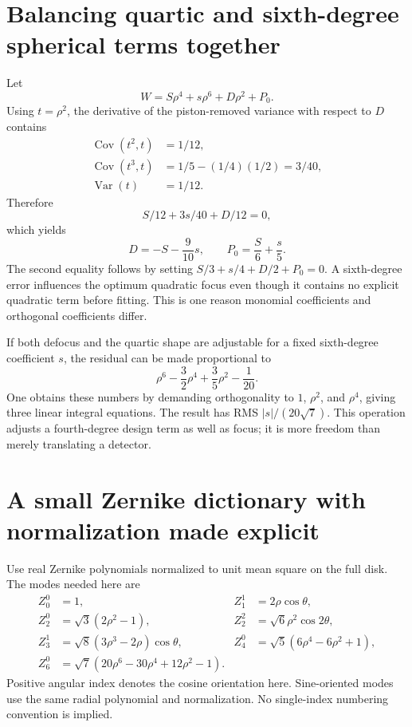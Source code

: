 \section{Balancing quartic and sixth-degree spherical terms together}
Let
\begin{equation}
 W=S\rho^4+s\rho^6+D\rho^2+P_0.
\end{equation}
Using $t=\rho^2$, the derivative of the piston-removed variance with respect
to $D$ contains
\begin{align}
 \operatorname{Cov}(t^2,t)&=1/12,\\
 \operatorname{Cov}(t^3,t)&=1/5-(1/4)(1/2)=3/40,\\
 \operatorname{Var}(t)&=1/12.
\end{align}
Therefore
\begin{equation}
 S/12+3s/40+D/12=0,
\end{equation}
which yields
\begin{equation}
 \boxed{D=-S-\frac9{10}s,\qquad P_0=\frac S6+\frac s5.}
 \label{ab:balance46}
\end{equation}
The second equality follows by setting
$S/3+s/4+D/2+P_0=0$. A sixth-degree error influences the optimum quadratic
focus even though it contains no explicit quadratic term before fitting.
This is one reason monomial coefficients and orthogonal coefficients differ.

If both defocus and the quartic shape are adjustable for a fixed sixth-degree
coefficient $s$, the residual can be made proportional to
\begin{equation}
 \rho^6-\frac32\rho^4+\frac35\rho^2-\frac1{20}.
\end{equation}
One obtains these numbers by demanding orthogonality to $1$, $\rho^2$, and
$\rho^4$, giving three linear integral equations. The result has RMS
$|s|/(20\sqrt7)$. This operation adjusts a fourth-degree design term as
well as focus; it is more freedom than merely translating a detector.

\section{A small Zernike dictionary with normalization made explicit}
Use real Zernike polynomials normalized to unit mean square on the full disk.
The modes needed here are
\begin{align}
 Z_0^0&=1, & Z_1^1&=2\rho\cos\theta,\\
 Z_2^0&=\sqrt3(2\rho^2-1), &
 Z_2^2&=\sqrt6\rho^2\cos2\theta,\\
 Z_3^1&=\sqrt8(3\rho^3-2\rho)\cos\theta, &
 Z_4^0&=\sqrt5(6\rho^4-6\rho^2+1),\\
 Z_6^0&=\sqrt7(20\rho^6-30\rho^4+12\rho^2-1).
\end{align}
Positive angular index denotes the cosine orientation here. Sine-oriented
modes use the same radial polynomial and normalization. No single-index
numbering convention is implied.

